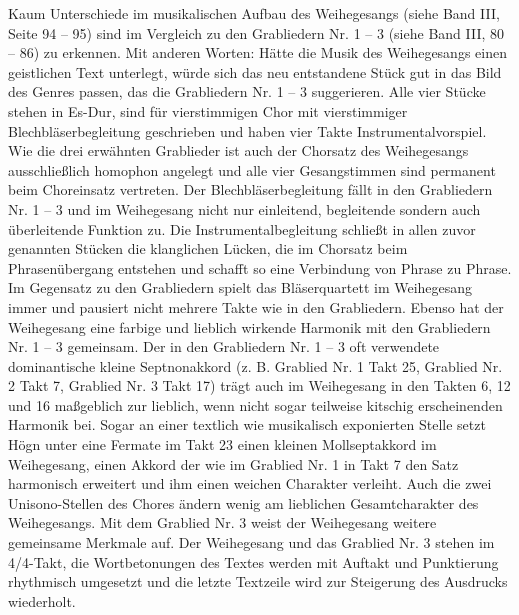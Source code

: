 Kaum Unterschiede im musikalischen Aufbau des Weihegesangs (siehe Band
III, Seite 94 – 95) sind im Vergleich zu den Grabliedern Nr. 1 – 3
(siehe Band III, 80 – 86) zu erkennen. Mit anderen Worten: Hätte die
Musik des Weihegesangs einen geistlichen Text unterlegt, würde sich das
neu entstandene Stück gut in das Bild des Genres passen, das die
Grabliedern Nr. 1 – 3 suggerieren. Alle vier Stücke stehen in Es-Dur,
sind für vierstimmigen Chor mit vierstimmiger Blechbläserbegleitung
geschrieben und haben vier Takte Instrumentalvorspiel. Wie die drei
erwähnten Grablieder ist auch der Chorsatz des Weihegesangs
ausschließlich homophon angelegt und alle vier Gesangstimmen sind
permanent beim Choreinsatz vertreten. Der Blechbläserbegleitung fällt
in den Grabliedern Nr. 1 – 3 und im Weihegesang nicht nur einleitend,
begleitende sondern auch überleitende Funktion zu. Die
Instrumentalbegleitung schließt in allen zuvor genannten Stücken die
klanglichen Lücken, die im Chorsatz beim Phrasenübergang entstehen und
schafft so eine Verbindung von Phrase zu Phrase. Im Gegensatz zu den
Grabliedern spielt das Bläserquartett im Weihegesang immer und pausiert
nicht mehrere Takte wie in den Grabliedern. \newline
Ebenso hat der Weihegesang eine farbige und lieblich wirkende Harmonik
mit den Grabliedern Nr. 1 – 3 gemeinsam. Der in den Grabliedern Nr. 1 –
3 oft verwendete dominantische kleine Septnonakkord (z. B. Grablied Nr.
1 Takt 25, Grablied Nr. 2 Takt 7, Grablied Nr. 3 Takt 17) trägt auch im
Weihegesang in den Takten 6, 12 und 16 maßgeblich zur lieblich, wenn
nicht sogar teilweise kitschig erscheinenden Harmonik bei. Sogar an
einer textlich wie musikalisch exponierten Stelle setzt Högn unter eine
Fermate im Takt 23 einen kleinen Mollseptakkord im Weihegesang, einen
Akkord der wie im Grablied Nr. 1 in Takt 7 den Satz harmonisch
erweitert und ihm einen weichen Charakter verleiht. Auch die zwei
Unisono-Stellen des Chores ändern wenig am lieblichen Gesamtcharakter
des Weihegesangs. Mit dem Grablied Nr. 3 weist der Weihegesang weitere
gemeinsame Merkmale auf. Der Weihegesang und das Grablied Nr. 3 stehen
im 4/4-Takt, die Wortbetonungen des Textes werden mit Auftakt und
Punktierung rhythmisch umgesetzt und die letzte Textzeile wird zur
Steigerung des Ausdrucks wiederholt.

